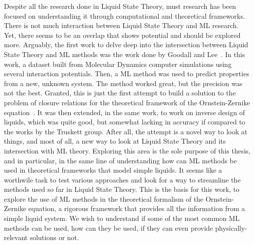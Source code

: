 Despite all the research done in Liquid State Theory, must research has been focused on
understanding it through computational and theoretical frameworks. There is not much
interaction between Liquid State Theory and ML research. Yet, there seems to be an overlap
that shows potential and should be explored more. Arguably, the first work to delve deep 
into the intersection between Liquid State Theory and ML methods was the work done by
Goodall and Lee~\cite{DatadrivenApproximationsBridge}.
In this work, a dataset built from Molecular Dynamics computer simulations using several
interaction potentials. Then, a ML method was used to predict properties from a new,
unknown system. The method worked great, but the precision was not the best. Granted, this
is just the first attempt to build a solution to the problem of closure relations
for the theoretical framework of the Ornstein-Zernike equation~\cite{hansenTheorySimpleLiquids2013}.
It was then extended, in the same work, to work on inverse design of liquids, which was
quite good, but somewhat lacking in accuracy if compared to the works by the Truskett group.
After all, the attempt is a novel way to look at things, and most of all, a new way to
look at Liquid State Theory and its intersection with ML theory.
Exploring this area is the sole purpose of this thesis, and in particular, in the same
line of understanding how can ML methods be used in theoretical frameworks that model
simple liquids. It seems like a worthwile task to test various approaches and look for a
way to streamline the methods used so far in Liquid State Theory. This is the basis for
this work, to explore the use of ML methods in the theoretical formalism of the
Ornstein-Zernike equation, a rigorous framework that provides all the information from
a simple liquid system. We wish to understand if some of the most common ML methods
can be used, how can they be used, if they can even provide physically-relevant
solutions or not.


